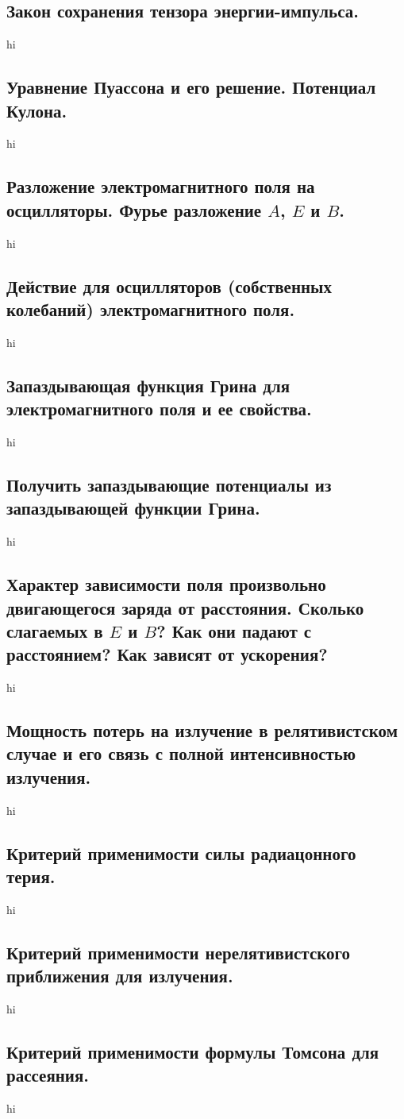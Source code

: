 \documentclass[a4paper,12pt]{article}
\begin{document}
\subsection{Закон сохранения тензора энергии-импульса.}
hi
\subsection{Уравнение Пуассона и его решение. Потенциал Кулона.}
hi
\subsection{Разложение электромагнитного поля на осцилляторы. Фурье разложение 
$A$, $E$ и $B$.}
hi
\subsection{Действие для осцилляторов (собственных колебаний)
электромагнитного поля.}
hi
\subsection{Запаздывающая функция Грина для электромагнитного поля и ее
свойства.}
hi
\subsection{Получить запаздывающие потенциалы из запаздывающей функции Грина.}
hi
\subsection{Характер зависимости поля произвольно двигающегося заряда от
расстояния. Сколько слагаемых в $E$ и $B$? Как они падают с расстоянием?
Как зависят от ускорения?}
hi
\subsection{Мощность потерь на излучение в релятивистском случае и его связь
с полной интенсивностью излучения.}
hi
\subsection{Критерий применимости силы радиацонного терия.}
hi
\subsection{Критерий применимости нерелятивистского приближения для излучения.}
hi
\subsection{Критерий применимости формулы Томсона для рассеяния.}
hi
\end{document}
